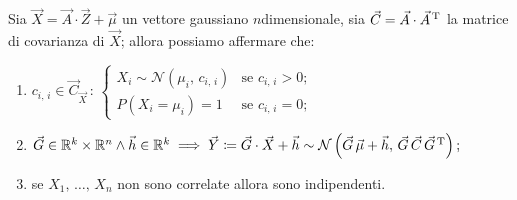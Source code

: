         \begin{prty}
            Sia $\vec{X} = \vec{A} \cdot \vec{Z} + \vec{\mu}$ un vettore gaussiano $n$\nbdash dimensionale, 
            sia $\vec{C} = \vec{A} \cdot \vec{A}^{\text{\,T}}$ la matrice di covarianza di $\vec{X}$; 
            allora possiamo affermare che:
            \begin{enumerate}
                \item $c_{i,\,i} \in \vec{C}_{\vec{X}} \,:\, \begin{cases}
                    X_i \sim \mathcal{N}(\mu_i,\,c_{i,\,i}) & \text{se $c_{i,\,i} > 0$;} \\
                    P(X_i = \mu_i) = 1 & \text{se $c_{i,\,i} = 0$;}
                    \end{cases}$
                \item $\vec{G} \in \mathbb{R}^k \times \mathbb{R}^n \land \vec{h} \in \mathbb{R}^k
                    \implies \vec{Y} \coloneqq \vec{G} \cdot \vec{X} + \vec{h} \sim 
                    \mathcal{N}\left(\vec{G}\, \vec{\mu} + \vec{h},\, \vec{G}\, \vec{C}\, \vec{G}^{\text{\,T}}\right);$
                \item se $X_1,\, \ldots,\, X_{n}$ non sono correlate allora sono indipendenti.
            \end{enumerate}
        \end{prty}
